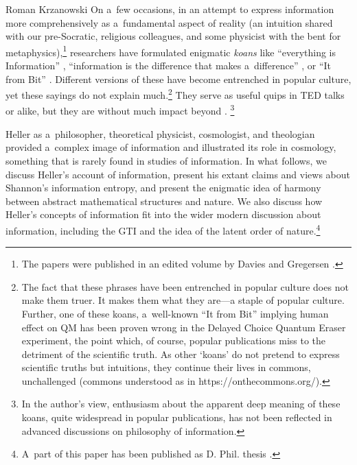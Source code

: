 \begin{artengenv}{Roman Krzanowski}
On a~few occasions, in an attempt to express information more comprehensively as a~fundamental aspect of reality (an intuition shared with our pre-Socratic, religious colleagues, and some physicist with the bent for metaphysics),\footnote{The papers were published in an edited volume by Davies and Gregersen 
\parencite*[][]{Davies2010-DAVIAT-5}.%
} researchers have formulated enigmatic \textit{koans} like ``everything is Information'' 
\parencite[][]{jones_everything_2018}, %
 ``information is the difference that makes a~difference'' 
\parencite[see][]{sloman_what_2018}, %
 or ``It from Bit'' 
\parencite[][]{wheeler_information_1989}. %
 Different versions of these have become entrenched in popular culture, yet these sayings do not explain much.\footnote{The fact that these phrases have been entrenched in popular culture does not make them truer. It makes them what they are---a staple of popular culture. Further, one of these koans, a~well-known ``It from Bit'' 
\parencite[][]{wheeler_information_1989} %
 implying human effect on QM has been proven wrong in the Delayed Choice Quantum Eraser experiment, the point which, of course, popular publications miss to the detriment of the scientific truth. As other ‘koans' do not pretend to express scientific truths but intuitions, they continue their lives in commons, unchallenged (commons understood as in https://onthecommons.org/).} They serve as useful quips in TED talks or alike, but they are without much impact beyond 
\parencite[see, e.g.,][]{tetlow_phil_2017}.%
\footnote{In the author's view, enthusiasm about the apparent deep meaning of these koans, quite widespread in popular publications, has not been reflected in advanced discussions on philosophy of information.}



Heller as a~philosopher, theoretical physicist, cosmologist, and theologian provided a~complex image of information and illustrated its role in cosmology, something that is rarely found in studies of information. In what follows, we discuss Heller's account of information, present his extant claims and views about Shannon's information entropy, and present the enigmatic idea of harmony between abstract mathematical structures and nature. We also discuss how Heller's concepts of information fit into the wider modern discussion about information, including the GTI and the idea of the latent order of nature.\footnote{A~part of this paper has been published as D. Phil. thesis 
\parencite[][]{krzanowski_ontological_2022}.%
}




\end{artengenv}
